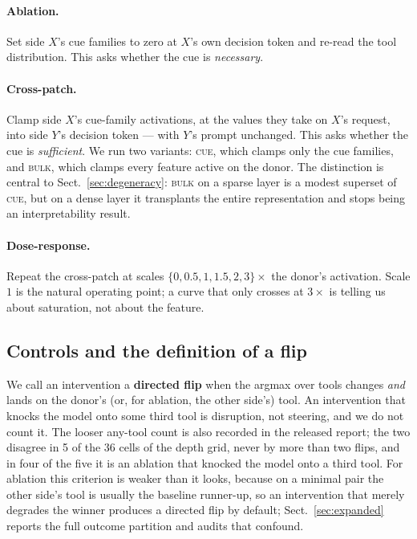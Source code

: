 \documentclass{article}
\begin{document}
\paragraph{Ablation.} Set side $X$'s cue families to zero at $X$'s own decision token and re-read the tool distribution. This asks whether the cue is \emph{necessary}.

\paragraph{Cross-patch.} Clamp side $X$'s cue-family activations, at the values they take on $X$'s request, into side $Y$'s decision token --- with $Y$'s prompt unchanged. This asks whether the cue is \emph{sufficient}. We run two variants: \textsc{cue}, which clamps only the cue families, and \textsc{bulk}, which clamps every feature active on the donor. The distinction is central to Sect.~\ref{sec:degeneracy}: \textsc{bulk} on a sparse layer is a modest superset of \textsc{cue}, but on a dense layer it transplants the entire representation and stops being an interpretability result.

\paragraph{Dose-response.} Repeat the cross-patch at scales $\{0, 0.5, 1, 1.5, 2, 3\} \times$ the donor's activation. Scale $1$ is the natural operating point; a curve that only crosses at $3\times$ is telling us about saturation, not about the feature.

\subsection{Controls and the definition of a flip}

We call an intervention a \textbf{directed flip} when the argmax over tools changes \emph{and} lands on the donor's (or, for ablation, the other side's) tool. An intervention that knocks the model onto some third tool is disruption, not steering, and we do not count it. The looser any-tool count is also recorded in the released report; the two disagree in 5 of the 36 cells of the depth grid, never by more than two flips, and in four of the five it is an ablation that knocked the model onto a third tool. For ablation this criterion is weaker than it looks, because on a minimal pair the other side's tool is usually the baseline runner-up, so an intervention that merely degrades the winner produces a directed flip by default; Sect.~\ref{sec:expanded} reports the full outcome partition and audits that confound.
\end{document}
